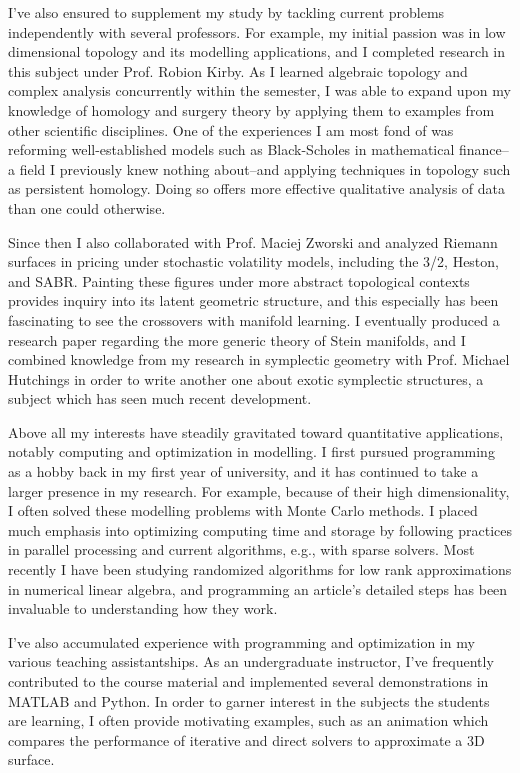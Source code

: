 \documentclass[11pt]{article}
\begin{document}
I've also ensured to supplement my study by tackling current problems independently with several professors. For example, my initial passion was in low dimensional topology and its modelling applications, and I completed research in this subject under Prof. Robion Kirby. As I learned algebraic topology and complex analysis concurrently within the semester, I was able to expand upon my knowledge of homology and surgery theory by applying them to examples from other scientific disciplines. One of the experiences I am most fond of was reforming well-established models such as Black-Scholes in mathematical finance--a field I previously knew nothing about--and applying techniques in topology such as persistent homology. Doing so offers more effective qualitative analysis of data than one could otherwise.

Since then I also collaborated with Prof. Maciej Zworski and analyzed Riemann surfaces in pricing under stochastic volatility models, including the 3/2, Heston, and SABR. Painting these figures under more abstract topological contexts provides inquiry into its latent geometric structure, and this especially has been fascinating to see the crossovers with manifold learning. I eventually produced a research paper regarding the more generic theory of Stein manifolds, and I combined knowledge from my research in symplectic geometry with Prof. Michael Hutchings in order to write another one about exotic symplectic structures, a subject which has seen much recent development.

Above all my interests have steadily gravitated toward quantitative applications, notably computing and optimization in modelling. I first pursued programming as a hobby back in my first year of university, and it has continued to take a larger presence in my research. For example, because of their high dimensionality, I often solved these modelling problems with Monte Carlo methods. I placed much emphasis into optimizing computing time and storage by following practices in parallel processing and current algorithms, e.g., with sparse solvers. Most recently I have been studying randomized algorithms for low rank approximations in numerical linear algebra, and programming an article's detailed steps has been invaluable to understanding how they work.

I've also accumulated experience with programming and optimization in my various teaching assistantships. As an undergraduate instructor, I've frequently contributed to the course material and implemented several demonstrations in MATLAB and Python. In order to garner interest in the subjects the students are learning, I often provide motivating examples, such as an animation which compares the performance of iterative and direct solvers to approximate a 3D surface.
\end{document}
